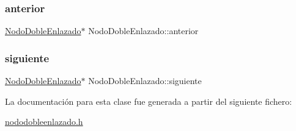 \subsubsection{\texorpdfstring{anterior}{anterior}}
{\footnotesize\ttfamily \mbox{\hyperlink{class_nodo_doble_enlazado}{Nodo\+Doble\+Enlazado}}$\ast$ Nodo\+Doble\+Enlazado\+::anterior}

\mbox{\label{class_nodo_doble_enlazado_a5e67691aee2e78dd7d89f7df80ca84da}} 
\subsubsection{\texorpdfstring{siguiente}{siguiente}}
{\footnotesize\ttfamily \mbox{\hyperlink{class_nodo_doble_enlazado}{Nodo\+Doble\+Enlazado}}$\ast$ Nodo\+Doble\+Enlazado\+::siguiente}



La documentación para esta clase fue generada a partir del siguiente fichero\+:\begin{DoxyCompactItemize}
\item 
\mbox{\hyperlink{nododobleenlazado_8h}{nododobleenlazado.\+h}}\end{DoxyCompactItemize}
